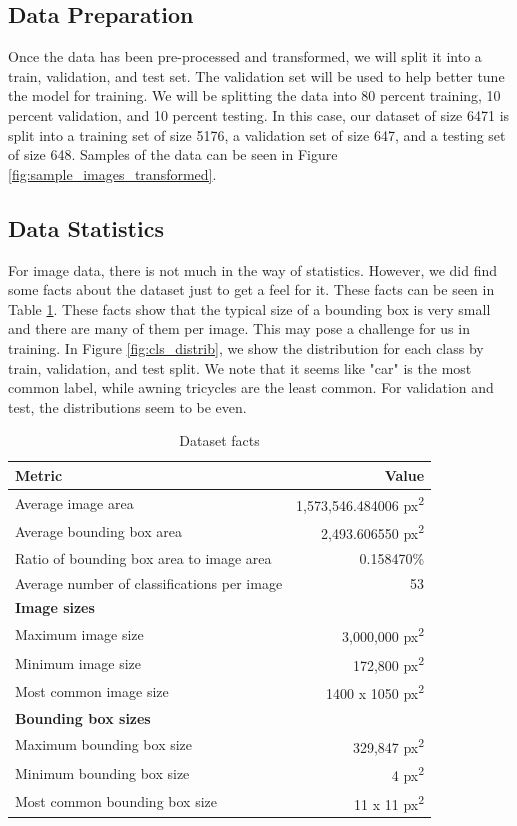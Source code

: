 \documentclass[stu,12pt,floatsintext]{apa7}
\begin{document}
\subsection{Data Preparation}
Once the data has been pre-processed and transformed, we will split it into a train, validation, and test set. The validation set will be used to help better tune the model for training. We will be splitting the data into 80 percent training, 10 percent validation, and 10 percent testing. In this case, our dataset of size 6471 is split into a training set of size 5176, a validation set of size 647, and a testing set of size 648. Samples of the data can be seen in Figure \ref{fig:sample_images_transformed}.

\subsection{Data Statistics}
For image data, there is not much in the way of statistics. However, we did find some facts about the dataset just to get a feel for it. These facts can be seen in Table \ref{tab:facts}. These facts show that the typical size of a bounding box is very small and there are many of them per image. This may pose a challenge for us in training. In Figure \ref{fig:cls_distrib}, we show the distribution for each class by train, validation, and test split. We note that it seems like "car" is the most common label, while awning tricycles are the least common. For validation and test, the distributions seem to be even.

\begin{table}[!htb]
    \centering
    \begin{tabular}{lr}
        \hline
        \textbf{Metric} & \textbf{Value} \\
        \hline
        Average image area & 1,573,546.484006 px\textsuperscript{2} \\
        Average bounding box area & 2,493.606550 px\textsuperscript{2} \\
        Ratio of bounding box area to image area & 0.158470\% \\
        Average number of classifications per image & 53 \\
        \hline
        \textbf{Image sizes} & \\
        \hline
        Maximum image size & 3,000,000 px\textsuperscript{2} \\
        Minimum image size & 172,800 px\textsuperscript{2} \\
        Most common image size & 1400 x 1050 px\textsuperscript{2} \\
        \hline
        \textbf{Bounding box sizes} & \\
        \hline
        Maximum bounding box size & 329,847 px\textsuperscript{2} \\
        Minimum bounding box size & 4 px\textsuperscript{2} \\
        Most common bounding box size & 11 x 11 px\textsuperscript{2} \\
        \hline
    \end{tabular}
    \caption{Dataset facts}
    \label{tab:facts}
\end{table}
\end{document}
